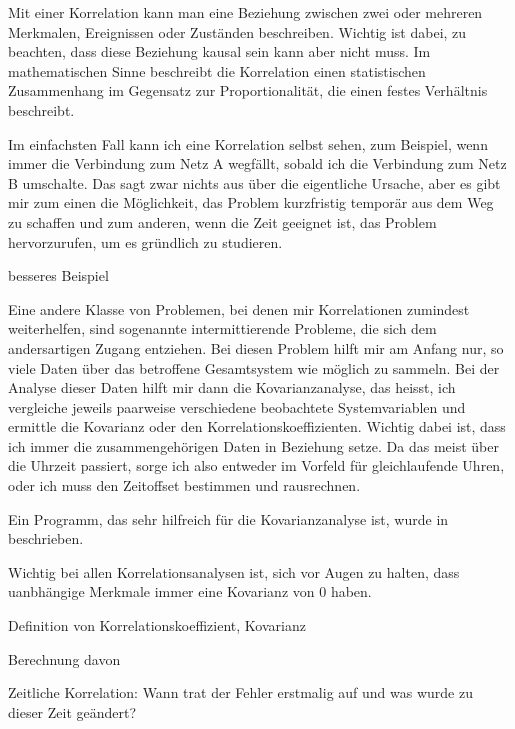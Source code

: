 \begin{normaltext}
Mit einer Korrelation kann man eine Beziehung zwischen zwei oder mehreren
Merkmalen, Ereignissen oder Zuständen beschreiben. Wichtig ist dabei, zu
beachten, dass diese Beziehung kausal sein kann aber nicht muss. Im
mathematischen Sinne beschreibt die Korrelation einen statistischen
Zusammenhang im Gegensatz zur Proportionalität, die einen festes Verhältnis
beschreibt.

Im einfachsten Fall kann ich eine Korrelation selbst sehen, zum Beispiel, wenn
immer die Verbindung zum Netz A wegfällt, sobald ich die Verbindung zum Netz B
umschalte.
Das sagt zwar nichts aus über die eigentliche Ursache, aber es gibt mir zum
einen die Möglichkeit, das Problem kurzfristig temporär aus dem Weg zu
schaffen und zum anderen, wenn die Zeit geeignet ist, das Problem
hervorzurufen, um es gründlich zu studieren.

\begin{notes}
\item besseres Beispiel
\end{notes}

Eine andere Klasse von Problemen, bei denen mir Korrelationen zumindest
weiterhelfen, sind sogenannte intermittierende Probleme, die sich dem
andersartigen Zugang entziehen.
Bei diesen Problem hilft mir am Anfang nur, so viele Daten über das betroffene
Gesamtsystem wie möglich zu sammeln.
Bei der Analyse dieser Daten hilft mir dann die Kovarianzanalyse, das heisst,
ich vergleiche jeweils paarweise verschiedene beobachtete Systemvariablen und
ermittle die Kovarianz oder den Korrelationskoeffizienten.
Wichtig dabei ist, dass ich immer die zusammengehörigen Daten in Beziehung
setze.
Da das meist über die Uhrzeit passiert, sorge ich also entweder im Vorfeld für
gleichlaufende Uhren, oder ich muss den Zeitoffset bestimmen und rausrechnen.

Ein Programm, das sehr hilfreich für die Kovarianzanalyse ist, wurde in
\cite{springerlink:10.1007/s00287-011-0541-z} beschrieben.

Wichtig bei allen Korrelationsanalysen ist, sich vor Augen zu halten, dass
uanbhängige Merkmale immer eine Kovarianz von 0 haben.

\end{normaltext}

\begin{notes}
\item Definition von Korrelationskoeffizient, Kovarianz
\item Berechnung davon
\item Zeitliche Korrelation: Wann trat der Fehler erstmalig auf und was wurde
  zu dieser Zeit geändert?
\end{notes}

